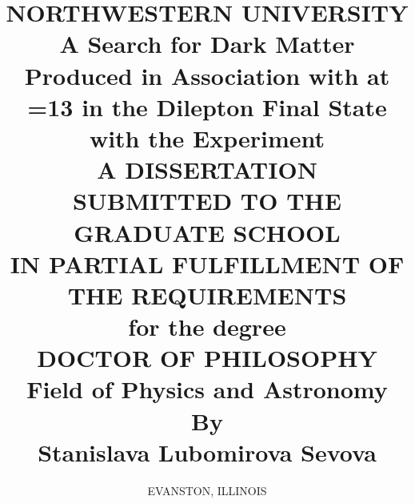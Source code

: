 \documentclass[hyperpdf,bindnopdf]{hepthesis}
\title{
  \normalsize
  \uppercase{Northwestern University} 
  \\
  \vspace{0.7 cm} 
  A Search for Dark Matter Produced in Association with \ttbar at \sqrtS=\unit{13}{\TeV} in the Dilepton Final State with the \CMS Experiment
  \\ 
  \vspace{0.7 cm}
  \uppercase{A Dissertation} \\
  \vspace{0.7 cm}
  \uppercase{Submitted to the graduate school \\ in partial fulfillment of the requirements} \\
  \vspace{0.7 cm}
  \small{for the degree} \\
  \vspace{0.7 cm}
  \uppercase{Doctor of Philosophy} \\
  \vspace{0.7 cm}
  Field of Physics and Astronomy \\
  \vspace{1.0 cm}
  By\\
  \vspace{0.3cm}
  Stanislava Lubomirova Sevova
}
\author{\normalsize \uppercase{Evanston, Illinois}}%
\begin{document}
\begin{frontmatter}
  
\end{frontmatter}

\begin{mainmatter}
  
  
  
  
\end{mainmatter}

\begin{appendices}
  
\end{appendices}

\begin{backmatter}
  
\end{backmatter}

\end{document}
